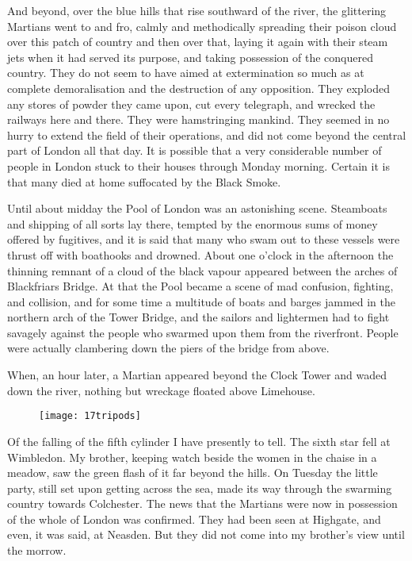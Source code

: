
And beyond, over the blue hills that rise southward of the river, the glittering Martians went to and fro, calmly and methodically spreading their poi\-son cloud over this patch of country and then over that, laying it again with their steam jets when it had served its purpose, and taking possession of the conquered country. They do not seem to have aimed at extermination so much as at complete demoralisation and the destruction of any opposition. They exploded any stores of powder they came upon, cut every telegraph, and wrecked the railways here and there. They were hamstringing mankind. They seemed in no hurry to extend the field of their operations, and did not come beyond the central part of London all that day. It is possible that a very considerable number of people in London stuck to their houses through Monday morning. Certain it is that many died at home suffocated by the Black Smoke.

Until about midday the Pool of London was an astonishing scene. Steamboats and shipping of all sorts lay there, tempted by the enormous sums of money offered by fugitives, and it is said that many who swam out to these vessels were thrust off with boathooks and drowned. About one o'clock in the afternoon the thinning remnant of a cloud of the black vapour appeared between the arches of Blackfriars Bridge. At that the Pool became a scene of mad confusion, fighting, and collision, and for some time a multitude of boats and barges jammed in the northern arch of the Tower Bridge, and the sailors and lightermen had to fight savagely against the people who swarmed upon them from the riverfront. People were actually clambering down the piers of the bridge from above.

When, an hour later, a Martian appeared beyond the Clock Tower and waded down the river, nothing but wreckage floated above Limehouse.

\begin{figure}[tb!]
\centering
\texttt{[image: 17tripods]}
\end{figure}

Of the falling of the fifth cylinder I have presently to tell. The sixth star fell at Wimbledon.\label{cylinder6} My brother, keeping watch beside the women in the chaise in a meadow, saw the green flash of it far beyond the hills. On Tuesday the little party, still set upon getting across the sea, made its way through the swarming country towards Colchester. The news that the Martians were now in possession of the whole of London was confirmed. They had been seen at Highgate, and even, it was said, at Neasden. But they did not come into my brother's view until the morrow.

